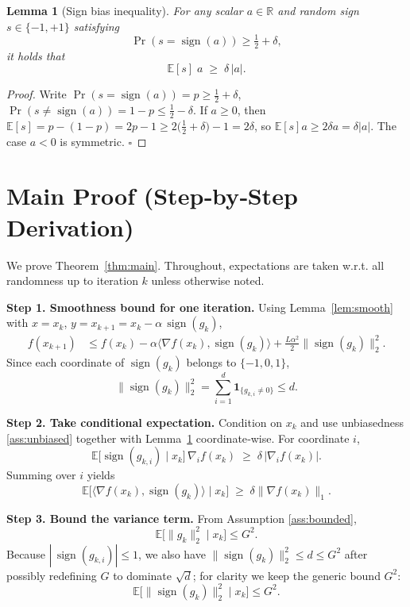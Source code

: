 \documentclass{article}
\newtheorem{lemma}{Lemma}
\newcommand{\E}{\mathbb{E}}
\newcommand{\R}{\mathbb{R}}
\begin{document}
\begin{lemma}[Sign bias inequality]\label{lem:signbias}
For any scalar $a\in\R$ and random sign $s\in\{-1,+1\}$ satisfying
\[
\Pr(s=\operatorname{sign}(a))\ge \tfrac12+\delta,
\]
it holds that
\[
\E[s]\;a\;\ge\; \delta\,|a|.
\]
\end{lemma}
\begin{proof}
Write $\Pr(s=\operatorname{sign}(a))=p\ge\tfrac12+\delta$, $\Pr(s\neq\operatorname{sign}(a))=1-p\le\tfrac12-\delta$.
If $a\ge0$, then $\E[s]=p-(1-p)=2p-1\ge 2\bigl(\tfrac12+\delta\bigr)-1=2\delta$,
so $\E[s]a\ge 2\delta a= \delta|a|$.
The case $a<0$ is symmetric. \hfill $\square$
\end{proof}

\section*{Main Proof (Step‑by‑Step Derivation)}
We prove Theorem~\ref{thm:main}. Throughout, expectations are taken w.r.t. all randomness up to iteration $k$ unless otherwise noted.

\noindent\textbf{Step 1. Smoothness bound for one iteration.}  
Using Lemma~\ref{lem:smooth} with $x=x_k$, $y=x_{k+1}=x_k-\alpha\,\operatorname{sign}(g_k)$,
\begin{align}
f(x_{k+1}) &\le f(x_k)-\alpha\langle\nabla f(x_k),\operatorname{sign}(g_k)\rangle
               +\frac{L\alpha^2}{2}\|\operatorname{sign}(g_k)\|_2^2 . \tag{3}
\end{align}
Since each coordinate of $\operatorname{sign}(g_k)$ belongs to $\{-1,0,1\}$,
\[
\|\operatorname{sign}(g_k)\|_2^2 = \sum_{i=1}^{d}\mathbf{1}_{\{g_{k,i}\neq0\}}\le d .
\tag{4}
\]

\noindent\textbf{Step 2. Take conditional expectation.}  
Condition on $x_k$ and use unbiasedness \ref{ass:unbiased} together with Lemma~\ref{lem:signbias} coordinate‑wise.
For coordinate $i$,
\[
\E\bigl[\operatorname{sign}(g_{k,i})\mid x_k\bigr]\,\nabla_i f(x_k)
\;\ge\; \delta\,|\nabla_i f(x_k)|.
\tag{5}
\]
Summing over $i$ yields
\[
\E\bigl[\langle\nabla f(x_k),\operatorname{sign}(g_k)\rangle\mid x_k\bigr]
\;\ge\;\delta\|\nabla f(x_k)\|_1 .
\tag{6}
\]

\noindent\textbf{Step 3. Bound the variance term.}  
From Assumption \ref{ass:bounded},
\[
\E\bigl[\|g_k\|_2^2\mid x_k\bigr]\le G^2 .
\tag{7}
\]
Because $|\,\operatorname{sign}(g_{k,i})|\le 1$, we also have $\|\operatorname{sign}(g_k)\|_2^2\le d\le G^2$ after possibly redefining $G$ to dominate $\sqrt d$; for clarity we keep the generic bound $G^2$:
\[
\E\bigl[\|\operatorname{sign}(g_k)\|_2^2\mid x_k\bigr]\le G^2 .
\tag{8}
\]
\end{document}

